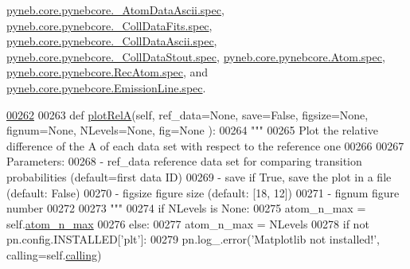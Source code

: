 \hyperlink{pynebcore_8py_source_l00312}{pyneb.\-core.\-pynebcore.\-\_\-\-Atom\-Data\-Ascii.\-spec}, \hyperlink{pynebcore_8py_source_l00578}{pyneb.\-core.\-pynebcore.\-\_\-\-Coll\-Data\-Fits.\-spec}, \hyperlink{pynebcore_8py_source_l00928}{pyneb.\-core.\-pynebcore.\-\_\-\-Coll\-Data\-Ascii.\-spec}, \hyperlink{pynebcore_8py_source_l01164}{pyneb.\-core.\-pynebcore.\-\_\-\-Coll\-Data\-Stout.\-spec}, \hyperlink{pynebcore_8py_source_l01220}{pyneb.\-core.\-pynebcore.\-Atom.\-spec}, \hyperlink{pynebcore_8py_source_l02637}{pyneb.\-core.\-pynebcore.\-Rec\-Atom.\-spec}, and \hyperlink{pynebcore_8py_source_l03390}{pyneb.\-core.\-pynebcore.\-Emission\-Line.\-spec}.


\begin{DoxyCode}
\hypertarget{classpyneb_1_1plot_1_1plot_atomic_data_1_1_data_plot_l00262}{}\hyperlink{classpyneb_1_1plot_1_1plot_atomic_data_1_1_data_plot_a9fc5e1df4de9471e26b20018ce89eb9d}{00262} 
00263     \textcolor{keyword}{def }\hyperlink{classpyneb_1_1plot_1_1plot_atomic_data_1_1_data_plot_a9fc5e1df4de9471e26b20018ce89eb9d}{plotRelA}(self, ref\_data=None, save=False, figsize=None, fignum=None, NLevels=None, fig=None
      ):
00264         \textcolor{stringliteral}{"""}
00265 \textcolor{stringliteral}{        Plot the relative difference of the A of each data set with respect to the reference one}
00266 \textcolor{stringliteral}{}
00267 \textcolor{stringliteral}{        Parameters:}
00268 \textcolor{stringliteral}{            - ref\_data       reference data set for comparing transition probabilities (default=first data
       ID)}
00269 \textcolor{stringliteral}{            - save           if True, save the plot in a file (default: False)}
00270 \textcolor{stringliteral}{            - figsize        figure size (default: [18, 12])}
00271 \textcolor{stringliteral}{            - fignum         figure number}
00272 \textcolor{stringliteral}{}
00273 \textcolor{stringliteral}{        """}
00274         \textcolor{keywordflow}{if} NLevels \textcolor{keywordflow}{is} \textcolor{keywordtype}{None}:
00275             atom\_n\_max = self.\hyperlink{classpyneb_1_1plot_1_1plot_atomic_data_1_1_data_plot_a668572cfe9a684e7195535d60d343938}{atom\_n\_max}
00276         \textcolor{keywordflow}{else}:
00277             atom\_n\_max = NLevels
00278         \textcolor{keywordflow}{if} \textcolor{keywordflow}{not} pn.config.INSTALLED[\textcolor{stringliteral}{'plt'}]:
00279             pn.log\_.error(\textcolor{stringliteral}{'Matplotlib not installed!'}, calling=self.\hyperlink{classpyneb_1_1plot_1_1plot_atomic_data_1_1_data_plot_a393a133b607541c57d5ebc5a34687e3f}{calling})

\end{DoxyCode}
